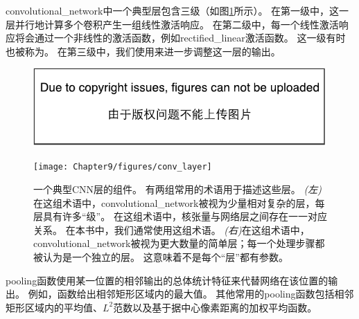 \gls{convolutional_network}中一个典型层包含三级（如图\ref{fig:chap9_conv_layer}所示）。
在第一级中，这一层并行地计算多个卷积产生一组线性激活响应。
在第二级中，每一个线性激活响应将会通过一个非线性的激活函数，例如\gls{rectified_linear}激活函数。
这一级有时也被称为。
在第三级中，我们使用来进一步调整这一层的输出。
\begin{figure}[!htb]
\ifOpenSource
\centerline{\includegraphics{figure.pdf}}
\else
\centerline{\texttt{[image: Chapter9/figures/conv\_layer]}}
\fi
\caption{一个典型\gls{CNN}层的组件。
有两组常用的术语用于描述这些层。
\emph{(左)}在这组术语中，\gls{convolutional_network}被视为少量相对复杂的层，每层具有许多``级''。
在这组术语中，核张量与网络层之间存在一一对应关系。
在本书中，我们通常使用这组术语。
\emph{(右)}在这组术语中，\gls{convolutional_network}被视为更大数量的简单层；每一个处理步骤都被认为是一个独立的层。
这意味着不是每个``层''都有参数。}
\label{fig:chap9_conv_layer}
\end{figure}

\gls{pooling}函数使用某一位置的相邻输出的总体统计特征来代替网络在该位置的输出。
例如，函数\citep{zhou1988computation}给出相邻矩形区域内的最大值。
其他常用的\gls{pooling}函数包括相邻矩形区域内的平均值、$L^2$范数以及基于据中心像素距离的加权平均函数。

 
